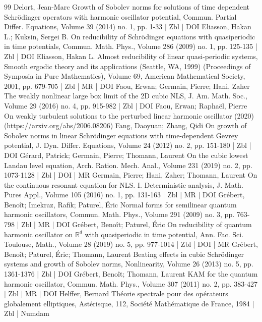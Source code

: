 \begin{thebibliography}{99}
Delort, Jean-Marc Growth of Sobolev norms for solutions of time dependent Schrödinger operators with harmonic oscillator potential, Commun. Partial Differ. Equations, Volume 39 (2014) no. 1, pp. 1-33 | Zbl | DOI
Eliasson, Hakan L.; Kuksin, Sergei B. On reducibility of Schrödinger equations with quasiperiodic in time potentials, Commun. Math. Phys., Volume 286 (2009) no. 1, pp. 125-135 | Zbl | DOI
Eliasson, Hakan L. Almost reducibility of linear quasi-periodic systems, Smooth ergodic theory and its applications (Seattle, WA, 1999) (Proceedings of Symposia in Pure Mathematics), Volume 69, American Mathematical Society, 2001, pp. 679-705 | Zbl | MR | DOI
Faou, Erwan; Germain, Pierre; Hani, Zaher The weakly nonlinear large box limit of the 2D cubic NLS, J. Am. Math. Soc., Volume 29 (2016) no. 4, pp. 915-982 | Zbl | DOI
Faou, Erwan; Raphaël, Pierre On weakly turbulent solutions to the perturbed linear harmonic oscillator (2020) (https://arxiv.org/abs/2006.08206)
Fang, Daoyuan; Zhang, Qidi On growth of Sobolev norms in linear Schrödinger equations with time-dependent Gevrey potential, J. Dyn. Differ. Equations, Volume 24 (2012) no. 2, pp. 151-180 | Zbl | DOI
Gérard, Patrick; Germain, Pierre; Thomann, Laurent On the cubic lowest Landau level equation, Arch. Ration. Mech. Anal., Volume 231 (2019) no. 2, pp. 1073-1128 | Zbl | DOI | MR
Germain, Pierre; Hani, Zaher; Thomann, Laurent On the continuous resonant equation for NLS. I. Deterministic analysis, J. Math. Pures Appl., Volume 105 (2016) no. 1, pp. 131-163 | Zbl | MR | DOI
Grébert, Benoît; Imekraz, Rafik; Paturel, Éric Normal forms for semilinear quantum harmonic oscillators, Commun. Math. Phys., Volume 291 (2009) no. 3, pp. 763-798 | Zbl | MR | DOI
Grébert, Benoît; Paturel, Éric On reducibility of quantum harmonic oscillator on ${\mathbb{R}}^d$ with quasiperiodic in time potential, Ann. Fac. Sci. Toulouse, Math., Volume 28 (2019) no. 5, pp. 977-1014 | Zbl | DOI | MR
Grébert, Benoît; Paturel, Éric; Thomann, Laurent Beating effects in cubic Schrödinger systems and growth of Sobolev norms, Nonlinearity, Volume 26 (2013) no. 5, pp. 1361-1376 | Zbl | DOI
Grébert, Benoît; Thomann, Laurent KAM for the quantum harmonic oscillator, Commun. Math. Phys., Volume 307 (2011) no. 2, pp. 383-427 | Zbl | MR | DOI
Helffer, Bernard Théorie spectrale pour des opérateurs globalement elliptiques, Astérisque, 112, Société Mathématique de France, 1984 | Zbl | Numdam

\end{thebibliography}
